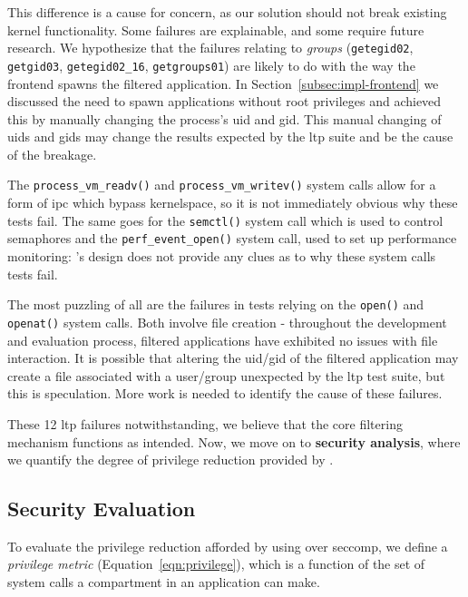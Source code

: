 This difference is a cause for concern, as our solution should not break
existing kernel functionality. Some failures are explainable, and some require
future research. We hypothesize that the failures relating to \textit{groups}
(\texttt{getegid02}, \texttt{getgid03}, \texttt{getegid02\_16},
\texttt{getgroups01}) are likely to do with the way the \af frontend spawns the
filtered application. In Section~\ref{subsec:impl-frontend} we discussed the
need to spawn applications without root privileges and achieved this by manually
changing the process's \ac{uid} and \ac{gid}. This manual changing of \acp{uid}
and \acp{gid} may change the results expected by the \ac{ltp} suite and be the
cause of the breakage.

The \texttt{process\_vm\_readv()} and \texttt{process\_vm\_writev()} system calls 
allow for a form of \ac{ipc} which bypass kernelspace, so it is not immediately 
obvious why these tests fail. The same goes for the \texttt{semctl()} system call
which is used to control semaphores and the \texttt{perf\_event\_open()}
system call, used to set up performance monitoring: \af's design does not provide any
clues as to why these system calls tests fail.

The most puzzling of all are the failures in tests relying on the 
\texttt{open()} and \texttt{openat()} system calls. Both involve file creation -
throughout the development and evaluation process, filtered applications have
exhibited no issues with file interaction. It is possible that altering the
\ac{uid}/\ac{gid} of the filtered application may create a file associated with
a user/group unexpected by the \ac{ltp} test suite, but this is speculation.
More work is needed to identify the cause of these failures.

These 12 \ac{ltp} failures notwithstanding, we believe that the core filtering
mechanism functions as intended. Now, we move on to \textbf{security analysis},
where we quantify the degree of privilege reduction provided by \af.

\subsection{Security Evaluation}\label{subsec:security-eval}

To evaluate the privilege reduction afforded by using \af over seccomp, we
define a \textit{privilege metric} (Equation~\ref{eqn:privilege}), which is
a function of the set of system calls a compartment in an application can make.

